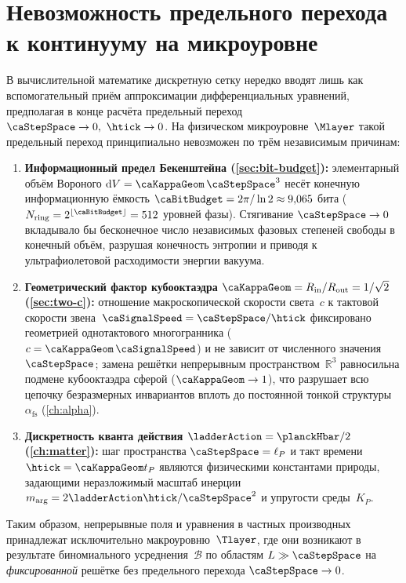 \section{Невозможность предельного перехода к континууму на микроуровне}
\label{sec:no-continuum-carrier}

В вычислительной математике дискретную сетку нередко вводят лишь как вспомогательный приём аппроксимации дифференциальных уравнений, предполагая в конце расчёта предельный переход $\caStepSpace\to 0,\ \htick\to 0$.
На физическом микроуровне~$\Mlayer$ такой предельный переход принципиально невозможен по трём независимым причинам:
\begin{enumerate}[leftmargin=*]
\item \textbf{Информационный предел Бекенштейна (\cref{sec:bit-budget}):}
  элементарный объём Вороного $\mathrm{d}V = \caKappaGeom\,\caStepSpace^3$ несёт конечную информационную ёмкость $\caBitBudget = 2\pi/\ln 2 \approx 9{,}065$ бита ($N_{\mathrm{ring}} = 2^{\lfloor\caBitBudget\rfloor} = 512$ уровней фазы).
  Стягивание $\caStepSpace\to 0$ вкладывало бы бесконечное число независимых фазовых степеней свободы в конечный объём, разрушая конечность энтропии и приводя к ультрафиолетовой расходимости энергии вакуума.
\item \textbf{Геометрический фактор кубооктаэдра $\caKappaGeom = R_{\mathrm{in}}/R_{\mathrm{out}} = 1/\sqrt{2}$ (\cref{sec:two-c}):}
  отношение макроскопической скорости света~$c$ к тактовой скорости звена~$\caSignalSpeed = \caStepSpace/\htick$ фиксировано геометрией однотактового многогранника ($c = \caKappaGeom\,\caSignalSpeed$) и не зависит от численного значения~$\caStepSpace$; замена решётки непрерывным пространством~$\mathbb{R}^3$ равносильна подмене кубооктаэдра сферой ($\caKappaGeom\to 1$), что разрушает всю цепочку безразмерных инвариантов вплоть до постоянной тонкой структуры~$\alpha_{\mathrm{fs}}$ (\cref{ch:alpha}).
\item \textbf{Дискретность кванта действия $\ladderAction = \planckHbar/2$ (\cref{ch:matter}):}
  шаг пространства $\caStepSpace = \ell_P$ и такт времени $\htick = \caKappaGeom t_P$ являются физическими константами природы, задающими неразложимый масштаб инерции $m_{\arg} = 2\ladderAction\htick/\caStepSpace^2$ и упругости среды~$K_P$.
\end{enumerate}

Таким образом, непрерывные поля и уравнения в частных производных принадлежат исключительно макроуровню~$\Tlayer$, где они возникают в результате биномиального усреднения~$\mathcal{B}$ по областям $L \gg \caStepSpace$ на \emph{фиксированной} решётке без предельного перехода $\caStepSpace\to 0$.
